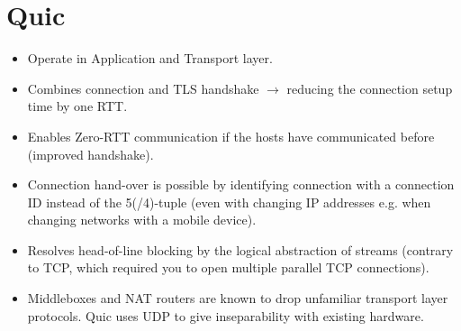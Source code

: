 \documentclass{article}
\begin{document}
\section{Quic}
\begin{itemize}
    \item Operate in Application and Transport layer.
    \item Combines connection and TLS handshake $\rightarrow$ reducing the connection setup time by one RTT.
    \item Enables Zero-RTT communication if the hosts have communicated before (improved handshake).
    \item Connection hand-over is possible by identifying connection with a connection ID instead of the 5(/4)-tuple (even with changing IP addresses e.g. when changing networks with a mobile device).
    \item Resolves head-of-line blocking by the logical abstraction of streams (contrary to TCP, which required you to open multiple parallel TCP connections).
    \item Middleboxes and NAT routers are known to drop unfamiliar transport layer protocols. Quic uses UDP to give inseparability with existing hardware.
\end{itemize}
\end{document}
